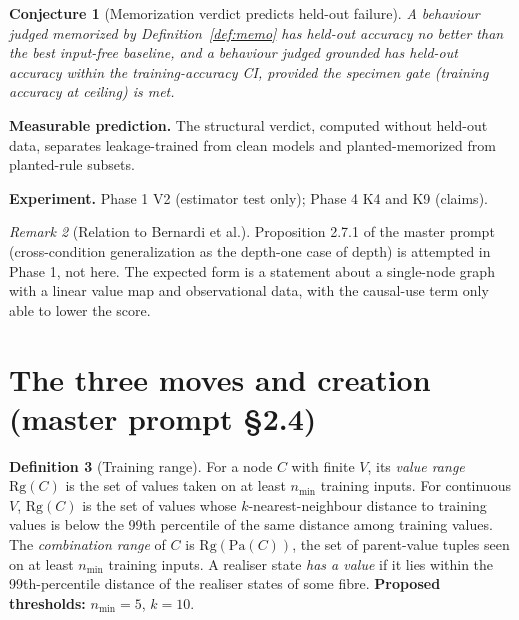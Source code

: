 \documentclass[11pt]{article}
\theoremstyle{definition}
\newtheorem{definition}{Definition}[section]
\theoremstyle{plain}
\newtheorem{conjecture}[definition]{Conjecture}
\theoremstyle{remark}
\newtheorem{remark}[definition]{Remark}
\newcommand{\pa}{\mathrm{Pa}}
\newcommand{\predict}[1]{\par\noindent\textbf{Measurable prediction.} #1}
\newcommand{\experiment}[1]{\par\noindent\textbf{Experiment.} #1\par\medskip}
\begin{document}
\begin{conjecture}[Memorization verdict predicts held-out failure]
\label{conj:memo}
A behaviour judged memorized by Definition~\ref{def:memo} has held-out accuracy no
better than the best input-free baseline, and a behaviour judged grounded has
held-out accuracy within the training-accuracy CI, provided the specimen gate
(training accuracy at ceiling) is met.
\end{conjecture}
\predict{The structural verdict, computed without held-out data, separates
leakage-trained from clean models and planted-memorized from planted-rule
subsets.}
\experiment{Phase 1 V2 (estimator test only); Phase 4 K4 and K9 (claims).}

\begin{remark}[Relation to Bernardi et al.]
Proposition 2.7.1 of the master prompt (cross-condition generalization as the
depth-one case of depth) is attempted in Phase 1, not here. The expected
form is a statement about a single-node graph with a linear value map and
observational data, with the causal-use term only able to lower the score.
\end{remark}

\section{The three moves and creation (master prompt \S2.4)}
\label{sec:moves}

\begin{definition}[Training range]\label{def:range}
For a node $C$ with finite $V$, its \emph{value range} $\mathrm{Rg}(C)$ is the
set of values taken on at least $n_{\min}$ training inputs. For continuous
$V$, $\mathrm{Rg}(C)$ is the set of values whose $k$-nearest-neighbour
distance to training values is below the 99th percentile of the same distance
among training values. The \emph{combination range} of $C$ is
$\mathrm{Rg}(\pa(C))$, the set of parent-value tuples seen on at least
$n_{\min}$ training inputs. A realiser state \emph{has a value} if it lies
within the 99th-percentile distance of the realiser states of some fibre.
\textbf{Proposed thresholds:} $n_{\min}=5$, $k=10$.
\end{definition}
\end{document}
